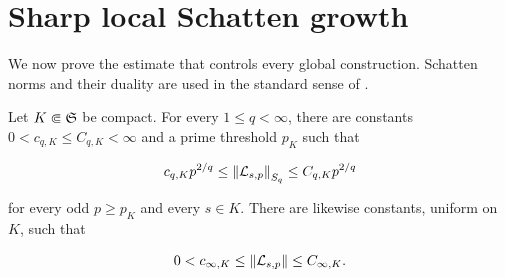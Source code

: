 \section{Sharp local Schatten growth}
\label{sec:schatten}

We now prove the estimate that controls every global construction.  Schatten
norms and their duality are used in the standard sense of
\citet{simon2005}.

\begin{theorem}
\label{thm:sharp-local}
Let \(K\Subset\mathfrak S\) be compact.  For every
\(1\le q<\infty\), there are constants
\(0<c_{q,K}\le C_{q,K}<\infty\) and a prime threshold \(p_K\) such that

\begin{equation}
 c_{q,K}p^{2/q}
 \le \left\lVert\mathcal L_{s,p}\right\rVert_{S_{q}}
 \le C_{q,K}p^{2/q}
 \label{eq:sharp-local}
\end{equation}

for every odd \(p\ge p_K\) and every \(s\in K\).  There are likewise
constants, uniform on \(K\), such that

\begin{equation}
 0<c_{\infty,K}
 \le \left\lVert\mathcal L_{s,p}\right\rVert
 \le C_{\infty,K}.
 \label{eq:sharp-op}
\end{equation}
\end{theorem}

